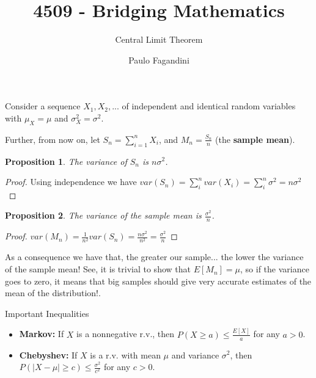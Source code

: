 \documentclass[aspectratio=169]{beamer}
\title[]{4509 - Bridging Mathematics}
\subtitle{Central Limit Theorem}
\author[P. Fagandini]{Paulo Fagandini}
\institute{}
\date{}
\newtheorem{proposition}{Proposition}[section]
\begin{document}
\begin{frame}
    Consider a sequence $X_1,X_2,...$ of independent and identical random variables with $\mu_X=\mu$ and $\sigma_X^2=\sigma^2$.
    \vspace{0.4cm}
    
    Further, from now on, let $S_n=\sum_{i=1}^n X_i$, and $M_n=\frac{S_n}{n}$ (the \textbf{sample mean}).
    

\end{frame}

\begin{frame}
    \begin{proposition}
        The variance of $S_n$ is $n\sigma^2$.
    \end{proposition}\pause
    \begin{proof}
        Using independence we have $var(S_n)=\sum_{i}^n var(X_i)=\sum_{i}^n \sigma^2=n\sigma^2$
    \end{proof}
\end{frame}

\begin{frame}
    \begin{proposition}
        The variance of the sample mean is $\frac{\sigma^2}{n}$.
    \end{proposition}\pause
    \begin{proof}
        $var(M_n)=\frac{1}{n^2}var(S_n)=\frac{n\sigma^2}{n^2}=\frac{\sigma^2}{n}$
    \end{proof}
    \vspace{0.2cm}
    As a consequence we have that, the greater our sample... the lower the variance of the sample mean! See, it is trivial to show that $E[M_n]=\mu$, so if the variance goes to zero, it means that big samples should give very accurate estimates of the mean of the distribution!.
\end{frame}

\begin{frame}{Important Inequalities}
    \begin{itemize}
        \item \textbf{Markov:} If $X$ is a nonnegative r.v., then $P(X\geq a) \leq \frac{E[X]}{a}$ for any $a>0$.
        \item \textbf{Chebyshev:} If $X$ is a r.v. with mean $\mu$ and variance $\sigma^2$, then $P(|X-\mu|\geq c)\leq\frac{\sigma^2}{c^2}$ for any $c>0$.
    \end{itemize}
\end{frame}
\end{document}
